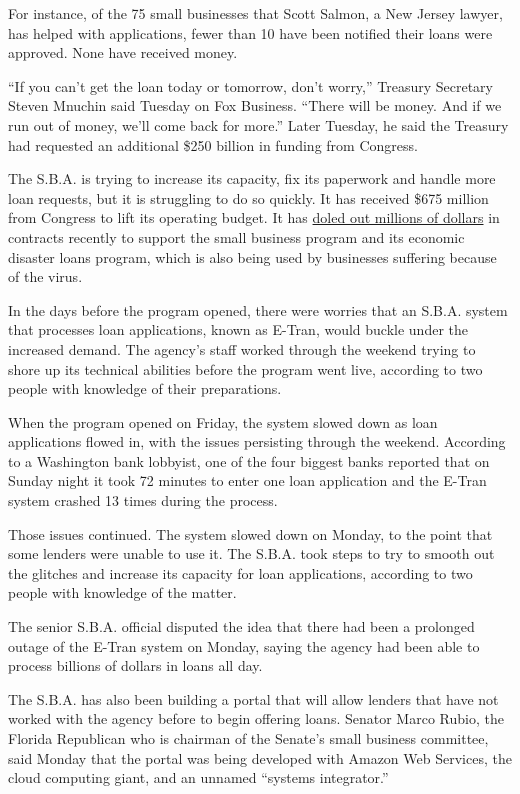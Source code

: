 For instance, of the 75 small businesses that Scott Salmon, a New Jersey
lawyer, has helped with applications, fewer than 10 have been notified
their loans were approved. None have received money.

``If you can't get the loan today or tomorrow, don't worry,'' Treasury
Secretary Steven Mnuchin said Tuesday on Fox Business. ``There will be
money. And if we run out of money, we'll come back for more.'' Later
Tuesday, he said the Treasury had requested an additional \$250 billion
in funding from Congress.

The S.B.A. is trying to increase its capacity, fix its paperwork and
handle more loan requests, but it is struggling to do so quickly. It has
received \$675 million from Congress to lift its operating budget. It
has
\href{https://www.nytimes.com/2020/04/03/us/politics/small-business-administration-coronavirus.html}{doled
out millions of dollars} in contracts recently to support the small
business program and its economic disaster loans program, which is also
being used by businesses suffering because of the virus.

In the days before the program opened, there were worries that an S.B.A.
system that processes loan applications, known as E-Tran, would buckle
under the increased demand. The agency's staff worked through the
weekend trying to shore up its technical abilities before the program
went live, according to two people with knowledge of their preparations.

When the program opened on Friday, the system slowed down as loan
applications flowed in, with the issues persisting through the weekend.
According to a Washington bank lobbyist, one of the four biggest banks
reported that on Sunday night it took 72 minutes to enter one loan
application and the E-Tran system crashed 13 times during the process.

Those issues continued. The system slowed down on Monday, to the point
that some lenders were unable to use it. The S.B.A. took steps to try to
smooth out the glitches and increase its capacity for loan applications,
according to two people with knowledge of the matter.

The senior S.B.A. official disputed the idea that there had been a
prolonged outage of the E-Tran system on Monday, saying the agency had
been able to process billions of dollars in loans all day.

The S.B.A. has also been building a portal that will allow lenders that
have not worked with the agency before to begin offering loans. Senator
Marco Rubio, the Florida Republican who is chairman of the Senate's
small business committee, said Monday that the portal was being
developed with Amazon Web Services, the cloud computing giant, and an
unnamed ``systems integrator.''

